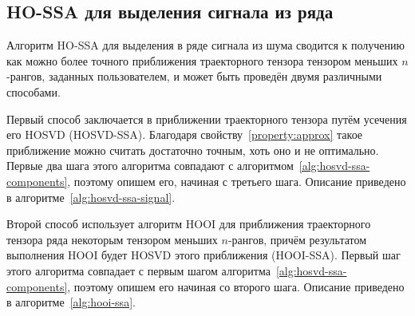 \documentclass[specialist,
    substylefile=spbu.rtx,
    subf,href,colorlinks=true, 12pt]{disser}
\theoremstyle{plain}
\theoremstyle{definition}
\theoremstyle{remark}
\begin{document}
    \subsection{HO-SSA для выделения сигнала из ряда}\label{subsec:ho-ssa-signal}
    Алгоритм HO-SSA для выделения в ряде сигнала из шума сводится к получению
    как можно более точного приближения траекторного тензора тензором меньших $n$-рангов, заданных пользователем, и
    может быть проведён двумя различными способами.

    Первый способ заключается в приближении траекторного тензора путём усечения его HOSVD (HOSVD-SSA).
    Благодаря свойству~\ref{property:approx} такое приближение можно считать достаточно точным,
    хоть оно и не оптимально.
    Первые два шага этого алгоритма совпадают с алгоритмом~\ref{alg:hosvd-ssa-components}, поэтому опишем его, начиная с третьего шага.
    Описание приведено в алгоритме~\ref{alg:hosvd-ssa-signal}.

    Второй способ использует алгоритм HOOI для приближения траекторного тензора ряда некоторым тензором
    меньших $n$-рангов, причём результатом выполнения HOOI будет HOSVD этого приближения (HOOI-SSA).
    Первый шаг этого алгоритма совпадает с первым шагом алгоритма~\ref{alg:hosvd-ssa-components},
    поэтому опишем его начиная со второго шага.
    Описание приведено в алгоритме~\ref{alg:hooi-ssa}.
\end{document}
